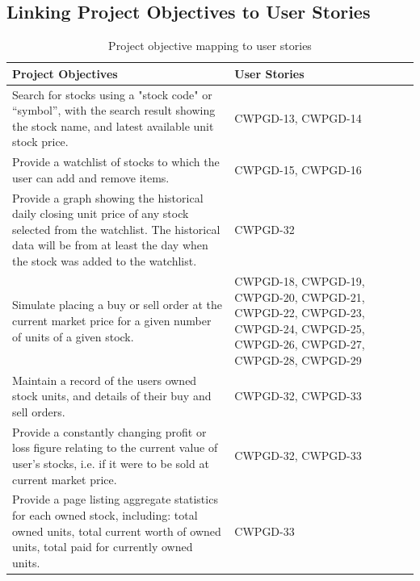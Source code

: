 
\subsection{Linking Project Objectives to User Stories}

\begin{table}[h]
    \caption{Project objective mapping to user stories}\label{tbl:objmap}
    \begin{tabular}{|m{11cm} | m{5cm}|}
        \hline \hline
        \textbf{Project Objectives}  & \textbf{User Stories} \\
        \hline
        Search for stocks using a "stock code" or “symbol”, with the search result showing the stock name, and latest available unit stock price. &  CWPGD-13, CWPGD-14   \\
        \hline
        Provide a watchlist of stocks to which the user can add and remove items.   & CWPGD-15, CWPGD-16   \\
        \hline
        Provide a graph showing the historical daily closing unit price of any stock selected from the watchlist. The historical data will be from at least the day when the stock was added to the watchlist. & CWPGD-32          \\
        \hline
        Simulate placing a buy or sell order at the current market price for a given number of units of a given stock.      &  CWPGD-18, CWPGD-19, CWPGD-20, CWPGD-21, CWPGD-22, CWPGD-23, CWPGD-24, CWPGD-25, CWPGD-26, CWPGD-27, CWPGD-28,  CWPGD-29              \\
        \hline
        Maintain a record of the users owned stock units, and details of their buy and sell orders.  &  CWPGD-32, CWPGD-33            \\
        \hline
        Provide a constantly changing profit or loss figure relating to the current value of user’s stocks, i.e. if it were to be sold at current market price. &  CWPGD-32, CWPGD-33            \\
        \hline
        Provide a page listing aggregate statistics for each owned stock, including: total owned units, total current worth of owned units, total paid for currently owned units.   & CWPGD-33 \\
        \hline \hline
    \end{tabular}
    
\end{table}


